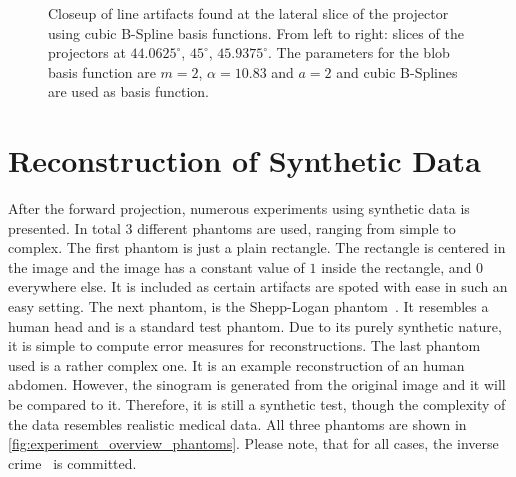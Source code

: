 \begin{figure}
	\centering

	\caption{Closeup of line artifacts found at the lateral slice of the projector using cubic
		B-Spline basis functions. From left to right: slices of the projectors at
		\(44.0625^\circ\), \(45^\circ\), \(45.9375^\circ\). The parameters for the blob
		basis function are \(m=2\), \(\alpha=10.83\) and \(a=2\) and cubic B-Splines are
		used as basis function.
	}\label{fig:sinogram_bspline_3d_closeup}
\end{figure}

\section{Reconstruction of Synthetic Data}\label{sec:experiments_synthethic_projection}

After the forward projection, numerous experiments using synthetic data is presented. In total 3
different phantoms are used, ranging from simple to complex. The first phantom is just a plain
rectangle. The rectangle is centered in the image and the image has a constant value of \(1\) inside
the rectangle, and \(0\) everywhere else. It is included as certain artifacts are spoted with ease
in such an easy setting. The next phantom, is the Shepp-Logan phantom~\cite{shepp_fourier_1974}. It
resembles a human head and is a standard test phantom. Due to its purely synthetic nature, it is
simple to compute error measures for reconstructions. The last phantom used is a rather complex one.
It is an example reconstruction of an human abdomen. However, the sinogram is generated from the
original image and it will be compared to it. Therefore, it is still a synthetic test, though the
complexity of the data resembles realistic medical data. All three phantoms are shown in
\autoref{fig:experiment_overview_phantoms}. Please note, that for all cases, the inverse
crime~\cite{wirgin_inverse_2004} is committed.


